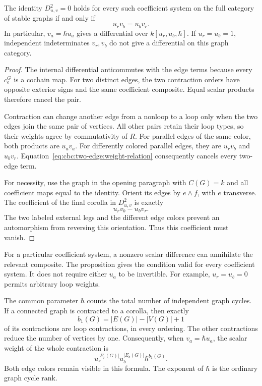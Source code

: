 \begin{proposition}\label{prop:cbc:two-edge:weights}
The identity $D_{u,v}^2=0$ holds for every such coefficient system on the full category of stable graphs if and only if
\begin{equation}\label{eq:cbc:two-edge:weight-relation}
 u_rv_b=u_bv_r.
\end{equation}
In particular, $v_a=\hbar u_a$ gives a differential over $k[u_r,u_b,\hbar]$.
If $u_r=u_b=1$, independent indeterminates $v_r,v_b$ do not give a differential on this graph category.
\end{proposition}
\begin{proof}
The internal differential anticommutes with the edge terms because every $c_e^G$ is a cochain map.
For two distinct edges, the two contraction orders have opposite exterior signs and the same coefficient composite.
Equal scalar products therefore cancel the pair.

Contraction can change another edge from a nonloop to a loop only when the two edges join the same pair of vertices.
All other pairs retain their loop types, so their weights agree by commutativity of $R$.
For parallel edges of the same color, both products are $u_av_a$.
For differently colored parallel edges, they are $u_rv_b$ and $u_bv_r$.
Equation~\eqref{eq:cbc:two-edge:weight-relation} consequently cancels every two-edge term.

For necessity, use the graph in the opening paragraph with $C(G)=k$ and all coefficient maps equal to the identity.
Orient its edges by $e\wedge f$, with $e$ transverse.
The coefficient of the final corolla in $D_{u,v}^2$ is exactly
\[
 u_rv_b-u_bv_r.
\]
The two labeled external legs and the different edge colors prevent an automorphism from reversing this orientation.
Thus this coefficient must vanish.
\end{proof}

For a particular coefficient system, a nonzero scalar difference can annihilate the relevant composite.
The proposition gives the condition valid for every coefficient system.
It does not require either $u_a$ to be invertible.
For example, $u_r=u_b=0$ permits arbitrary loop weights.

The common parameter $\hbar$ counts the total number of independent graph cycles.
If a connected graph is contracted to a corolla, then exactly
\[
 b_1(G)=|E(G)|-|V(G)|+1
\]
of its contractions are loop contractions, in every ordering.
The other contractions reduce the number of vertices by one.
Consequently, when $v_a=\hbar u_a$, the scalar weight of the whole contraction is
\begin{equation}\label{eq:cbc:two-edge:whole-weight}
 u_r^{|E_r(G)|}u_b^{|E_b(G)|}\hbar^{b_1(G)}.
\end{equation}
Both edge colors remain visible in this formula.
The exponent of $\hbar$ is the ordinary graph cycle rank.

